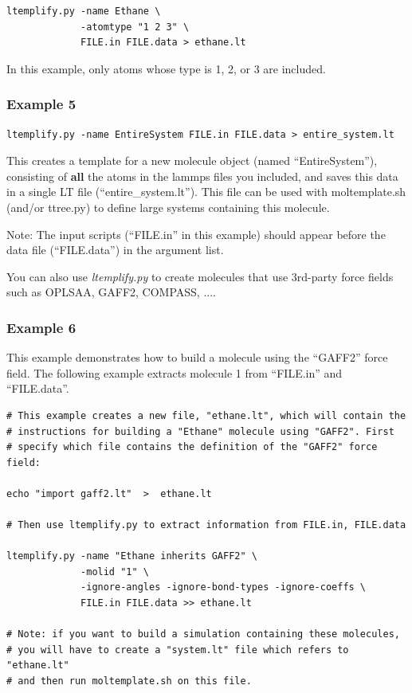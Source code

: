 \documentclass[11pt]{article}
\begin{document}
\begin{verbatim}
ltemplify.py -name Ethane \
             -atomtype "1 2 3" \
             FILE.in FILE.data > ethane.lt
\end{verbatim}

    In this example, only atoms whose type is 1, 2, or 3 are included.


    

\subsubsection*{Example 5}

\begin{verbatim}
ltemplify.py -name EntireSystem FILE.in FILE.data > entire_system.lt
\end{verbatim}

This creates a template for a new molecule object (named ``EntireSystem''),
consisting of \textbf{all} the atoms in the lammps files you included,
and saves this data in a single LT file (``entire\_system.lt'').
This file can be used with moltemplate.sh (and/or ttree.py) to
define large systems containing this molecule.

Note: The input scripts (``FILE.in'' in this example) should appear 
      before the data file (``FILE.data'') in the argument list.


\label{sec:ltemplify_examples_force_fields}


You can also use \textit{ltemplify.py} to create molecules that use 3rd-party
force fields such as OPLSAA, GAFF2, COMPASS, ....


\subsubsection*{ Example 6 }

This example demonstrates how to build a molecule
using the ``GAFF2'' force field.
The following example extracts molecule 1 from ``FILE.in'' and ``FILE.data''.

\begin{verbatim}
# This example creates a new file, "ethane.lt", which will contain the
# instructions for building a "Ethane" molecule using "GAFF2". First
# specify which file contains the definition of the "GAFF2" force field:

echo "import gaff2.lt"  >  ethane.lt

# Then use ltemplify.py to extract information from FILE.in, FILE.data

ltemplify.py -name "Ethane inherits GAFF2" \
             -molid "1" \
             -ignore-angles -ignore-bond-types -ignore-coeffs \
             FILE.in FILE.data >> ethane.lt

# Note: if you want to build a simulation containing these molecules,
# you will have to create a "system.lt" file which refers to "ethane.lt"
# and then run moltemplate.sh on this file.
\end{verbatim}
\end{document}
